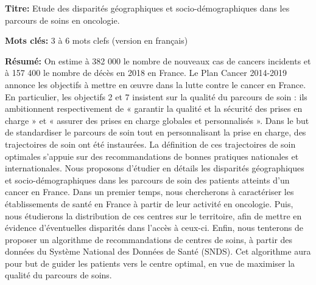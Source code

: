 \begin{mdframed}[linecolor=Prune,linewidth=1]

\textbf{Titre:} Etude des disparités géographiques et socio-démographiques dans les parcours de soins en oncologie.

\noindent \textbf{Mots clés:} 3 à 6 mots clefs (version en français)

\vspace{-.5cm}
\begin{multicols}{2}
\noindent \textbf{Résumé:} On estime à 382 000 le nombre de nouveaux cas de cancers incidents et à 157 400 le nombre de décès en 2018 en France. Le Plan Cancer 2014-2019 annonce les objectifs à mettre en œuvre dans la lutte contre le cancer en France. En particulier, les objectifs 2 et 7 insistent sur la qualité du parcours de soin : ils ambitionnent respectivement de « garantir la qualité et la sécurité des prises en charge » et « assurer des prises en charge globales et personnalisés ». Dans le but de standardiser le parcours de soin tout en personnalisant la prise en charge, des trajectoires de soin ont été instaurées. La définition de ces trajectoires de soin optimales s'appuie sur des recommandations de bonnes pratiques nationales et internationales. Nous proposons d'étudier en détails les disparités géographiques et socio-démographiques dans les parcours de soin des patients atteints d'un cancer en France. Dans un premier temps, nous chercherons à caractériser les établissements de santé en France à partir de leur activité en oncologie. Puis, nous étudierons la distribution de ces centres sur le territoire, afin de mettre en évidence d'éventuelles disparités dans l'accès à ceux-ci. Enfin, nous tenterons de proposer un algorithme de recommandations de centres de soins, à partir des données du Système National des Données de Santé (SNDS). Cet algorithme aura pour but de guider les patients vers le centre optimal, en vue de maximiser la qualité du parcours de soins.

\end{multicols}

\end{mdframed}